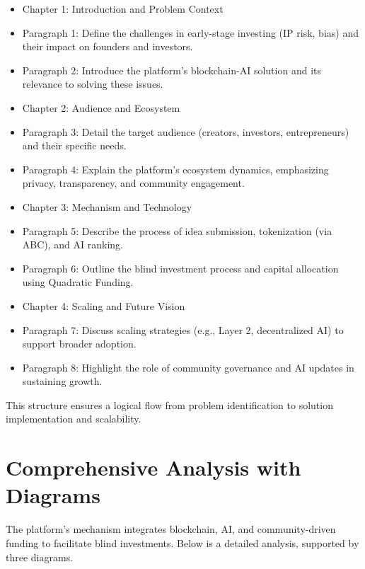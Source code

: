 \documentclass[12pt]{article}
\begin{document}
\begin{itemize}
    \item Chapter 1: Introduction and Problem Context
    \item Paragraph 1: Define the challenges in early-stage investing (IP risk, bias) and their impact on founders and investors.
    \item Paragraph 2: Introduce the platform's blockchain-AI solution and its relevance to solving these issues.

    \item Chapter 2: Audience and Ecosystem
    \item Paragraph 3: Detail the target audience (creators, investors, entrepreneurs) and their specific needs.
    \item Paragraph 4: Explain the platform's ecosystem dynamics, emphasizing privacy, transparency, and community engagement.

    \item Chapter 3: Mechanism and Technology
    \item Paragraph 5: Describe the process of idea submission, tokenization (via ABC), and AI ranking.
    \item Paragraph 6: Outline the blind investment process and capital allocation using Quadratic Funding.

    \item Chapter 4: Scaling and Future Vision
    \item Paragraph 7: Discuss scaling strategies (e.g., Layer 2, decentralized AI) to support broader adoption.
    \item Paragraph 8: Highlight the role of community governance and AI updates in sustaining growth.
\end{itemize}

This structure ensures a logical flow from problem identification to solution implementation and scalability.

\section{Comprehensive Analysis with Diagrams}

The platform's mechanism integrates blockchain, AI, and community-driven funding to facilitate blind investments. Below is a detailed analysis, supported by three diagrams.
\end{document}
